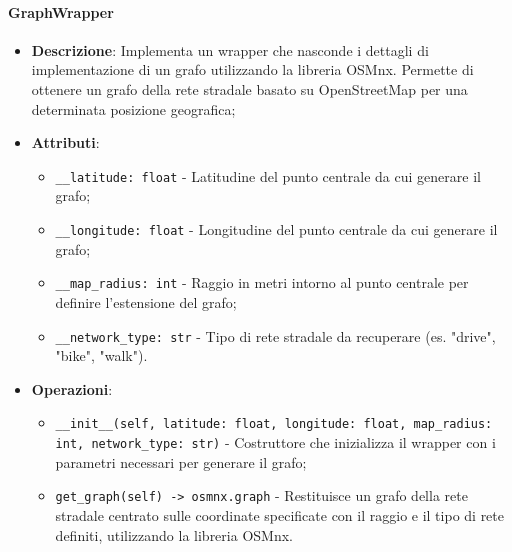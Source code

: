 \documentclass[10pt]{article}
\begin{document}
    \paragraph{GraphWrapper}
    \begin{itemize} 
    \item \textbf{Descrizione}: Implementa un wrapper che nasconde i dettagli di implementazione di un grafo utilizzando la libreria OSMnx. Permette di ottenere un grafo della rete stradale basato su OpenStreetMap per una determinata posizione geografica;
    \item \textbf{Attributi}:
    \begin{itemize}
        \item \texttt{\_\_latitude: float} - Latitudine del punto centrale da cui generare il grafo;
        \item \texttt{\_\_longitude: float} - Longitudine del punto centrale da cui generare il grafo;
        \item \texttt{\_\_map\_radius: int} - Raggio in metri intorno al punto centrale per definire l'estensione del grafo;
        \item \texttt{\_\_network\_type: str} - Tipo di rete stradale da recuperare (es. "drive", "bike", "walk").
    \end{itemize}
    
    \item \textbf{Operazioni}:
    \begin{itemize}
        \item \texttt{\_\_init\_\_(self, latitude: float, longitude: float, map\_radius: int, network\_type: str)} - Costruttore che inizializza il wrapper con i parametri necessari per generare il grafo;
        
        \item \texttt{get\_graph(self) -> osmnx.graph} - Restituisce un grafo della rete stradale centrato sulle coordinate specificate con il raggio e il tipo di rete definiti, utilizzando la libreria OSMnx.
    \end{itemize}
    \end{itemize}
\end{document}
